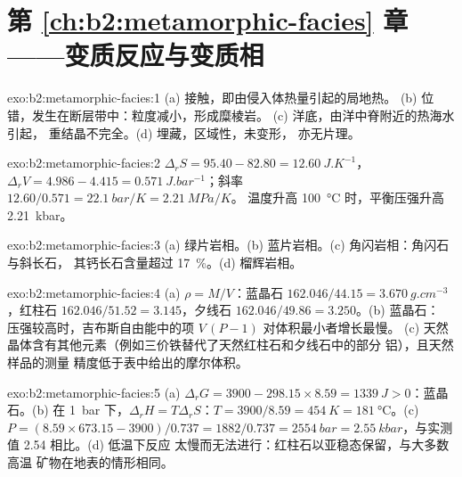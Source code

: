 \section*{第 \ref{ch:b2:metamorphic-facies} 章——变质反应与变质相}

\begin{solution}{exo:b2:metamorphic-facies:1}
(a) 接触，即由侵入体热量引起的局地热。
(b) 位错，发生在断层带中：粒度减小，形成糜棱岩。
(c) 洋底，由洋中脊附近的热海水引起，
重结晶不完全。(d) 埋藏，区域性，未变形，
亦无片理。
\end{solution}

\begin{solution}{exo:b2:metamorphic-facies:2}
$\Delta_r S = 95.40 - 82.80 = \qty{12.60}{J.K^{-1}}$，$\Delta_r V = 4.986 - 4.415 =
\qty{0.571}{J.bar^{-1}}$；斜率 $12.60/0.571 = \qty{22.1}{bar/K} = \qty{2.21}{MPa/K}$。
温度升高 \qty{100}{\celsius} 时，平衡压强升高 \qty{2.21}{kbar}。
\end{solution}

\begin{solution}{exo:b2:metamorphic-facies:3}
(a) 绿片岩相。(b) 蓝片岩相。(c) 角闪岩相：角闪石与斜长石，
其钙长石含量超过 \qty{17}{\percent}。(d) 榴辉岩相。
\end{solution}

\begin{solution}{exo:b2:metamorphic-facies:4}
(a) $\rho = M/V$：蓝晶石 $162.046/44.15 = \qty{3.670}{g.cm^{-3}}$，红柱石
$162.046/51.52 = 3.145$，夕线石 $162.046/49.86 = 3.250$。(b) 蓝晶石：
压强较高时，吉布斯自由能中的项 $V\,(P - 1)$ 对体积最小者增长最慢。
(c) 天然晶体含有其他元素（例如三价铁替代了天然红柱石和夕线石中的部分
铝），且天然样品的测量
精度低于表中给出的摩尔体积。
\end{solution}

\begin{solution}{exo:b2:metamorphic-facies:5}
(a) $\Delta_r G = 3900 - 298.15\times8.59 = \qty{+1339}{J} > 0$：蓝晶石。(b) 在
\qty{1}{bar} 下，$\Delta_r H = T\Delta_r S$：$T = 3900/8.59 = \qty{454}{K} =
\qty{181}{\celsius}$。(c) $P = (8.59\times673.15 - 3900)/0.737 = 1882/0.737 =
\qty{2554}{bar} = \qty{2.55}{kbar}$，与实测值 2.54 相比。(d) 低温下反应
太慢而无法进行：红柱石以亚稳态保留，与大多数高温
矿物在地表的情形相同。
\end{solution}

